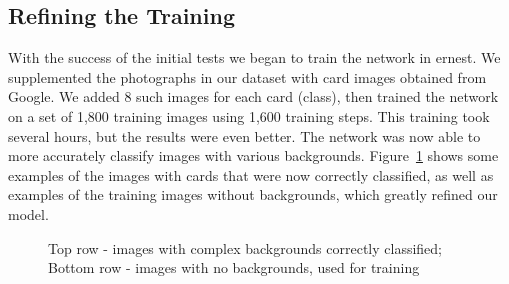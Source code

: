 \documentclass[letterpaper]{article}
\begin{document}
\subsection{Refining the Training}
With the success of the initial tests we began to train the network in ernest. We supplemented the photographs in our dataset with card images obtained from Google. We added 8 such images for each card (class), then trained the network on a set of 1,800 training images using 1,600 training steps.  This training took several hours, but the results were even better.  The network was now able to more accurately classify images with various backgrounds. Figure~\ref{fig:refining_results_1} shows some examples of the images with cards that were now correctly classified, as well as examples of the training images without backgrounds, which greatly refined our model.

\begin{figure}[!tbp]
  \centering

  \caption{\label{fig:refining_results_1} Top row - images with complex backgrounds correctly classified; Bottom row - images with no backgrounds, used for training}
\end{figure}
\end{document}
